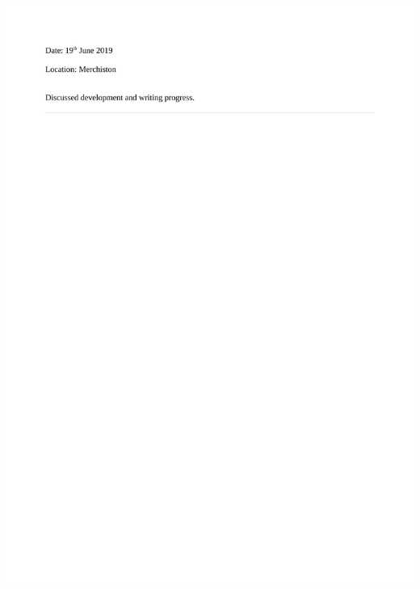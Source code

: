 \documentclass[12pt,a4paper]{article}
\begin{document}
\begin{appendices}
\includegraphics[scale=0.25]{Report/graphics/diary-3.png}

\end{appendices}
\end{document}
